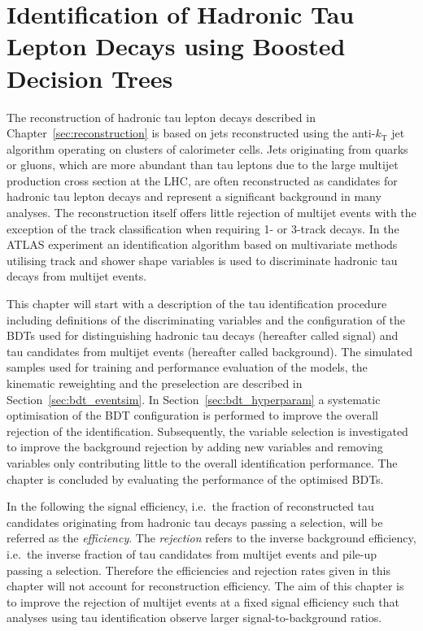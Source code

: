 \chapter{Identification of Hadronic Tau Lepton Decays using Boosted Decision
  Trees}
\label{sec:bdt}
The reconstruction of hadronic tau lepton decays described in
Chapter~\ref{sec:reconstruction} is based on jets reconstructed using the
anti-$k_\text{T}$ jet algorithm operating on clusters of calorimeter cells. Jets
originating from quarks or gluons, which are more abundant than tau leptons due
to the large multijet production cross section at the LHC, are often
reconstructed as candidates for hadronic tau lepton decays and represent a
significant background in many analyses. The reconstruction itself offers little
rejection of multijet events with the exception of the track classification when
requiring 1- or 3-track decays. In the ATLAS experiment an identification
algorithm based on multivariate methods utilising track and shower shape
variables is used to discriminate hadronic tau decays from multijet events.

This chapter will start with a description of the tau identification procedure
including definitions of the discriminating variables and the configuration of
the BDTs used for distinguishing hadronic tau decays (hereafter called signal)
and tau candidates from multijet events (hereafter called background). The
simulated samples used for training and performance evaluation of the models,
the kinematic reweighting and the preselection are described in
Section~\ref{sec:bdt_eventsim}. In Section~\ref{sec:bdt_hyperparam} a systematic
optimisation of the BDT configuration is performed to improve the overall
rejection of the identification. Subsequently, the variable selection is
investigated to improve the background rejection by adding new variables and
removing variables only contributing little to the overall identification
performance. The chapter is concluded by evaluating the performance of the
optimised BDTs.

In the following the signal efficiency, i.e.\ the fraction of reconstructed tau
candidates originating from hadronic tau decays passing a selection, will be
referred as the \emph{efficiency}. The \emph{rejection} refers to the inverse
background efficiency, i.e.\ the inverse fraction of tau candidates from
multijet events and pile-up passing a selection. Therefore the efficiencies and
rejection rates given in this chapter will not account for reconstruction
efficiency. The aim of this chapter is to improve the rejection of multijet
events at a fixed signal efficiency such that analyses using tau identification
observe larger signal-to-background ratios.

